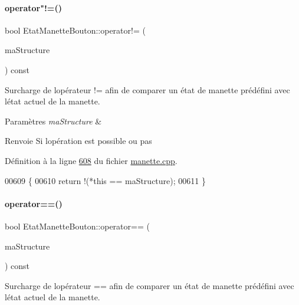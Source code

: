 \paragraph{\texorpdfstring{operator"!=()}{operator!=()}}
{\footnotesize\ttfamily bool Etat\+Manette\+Bouton\+::operator!= (\begin{DoxyParamCaption}\item[{const \hyperlink{struct_etat_manette_bouton}{Etat\+Manette\+Bouton} \&}]{ma\+Structure }\end{DoxyParamCaption}) const}



Surcharge de l\textquotesingle{}opérateur != afin de comparer un état de manette prédéfini avec l\textquotesingle{}état actuel de la manette. 


\begin{DoxyParams}{Paramètres}
{\em ma\+Structure} & \\
\hline
\end{DoxyParams}
\begin{DoxyReturn}{Renvoie}
Si l\textquotesingle{}opération est possible ou pas 
\end{DoxyReturn}


Définition à la ligne \hyperlink{manette_8cpp_source_l00608}{608} du fichier \hyperlink{manette_8cpp_source}{manette.\+cpp}.


\begin{DoxyCode}
00609 \{
00610     \textcolor{keywordflow}{return} !(*\textcolor{keyword}{this} == maStructure);
00611 \}
\end{DoxyCode}
\mbox{\label{struct_etat_manette_bouton_a7898661d3d19b6d8cf7005111d670ede}} 
\paragraph{\texorpdfstring{operator==()}{operator==()}}
{\footnotesize\ttfamily bool Etat\+Manette\+Bouton\+::operator== (\begin{DoxyParamCaption}\item[{const \hyperlink{struct_etat_manette_bouton}{Etat\+Manette\+Bouton} \&}]{ma\+Structure }\end{DoxyParamCaption}) const}



Surcharge de l\textquotesingle{}opérateur == afin de comparer un état de manette prédéfini avec l\textquotesingle{}état actuel de la manette. 


